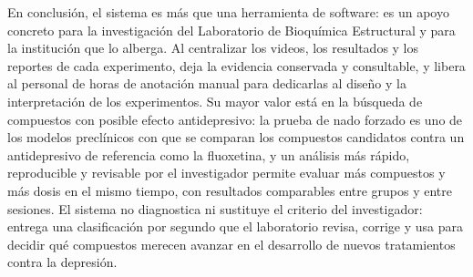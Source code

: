 En conclusión, el sistema es más que una herramienta de software: es un apoyo concreto
para la investigación del Laboratorio de Bioquímica Estructural y para la institución que
lo alberga. Al centralizar los videos, los resultados y los reportes de cada experimento,
deja la evidencia conservada y consultable, y libera al personal de horas de anotación
manual para dedicarlas al diseño y la interpretación de los experimentos. Su mayor valor
está en la búsqueda de compuestos con posible efecto antidepresivo: la prueba de nado
forzado es uno de los modelos preclínicos con que se comparan los compuestos candidatos
contra un antidepresivo de referencia como la fluoxetina, y un análisis más rápido,
reproducible y revisable por el investigador permite evaluar más compuestos y más dosis
en el mismo tiempo, con resultados comparables entre grupos y entre sesiones. El sistema
no diagnostica ni sustituye el criterio del investigador: entrega una clasificación por
segundo que el laboratorio revisa, corrige y usa para decidir qué compuestos merecen
avanzar en el desarrollo de nuevos tratamientos contra la depresión.
